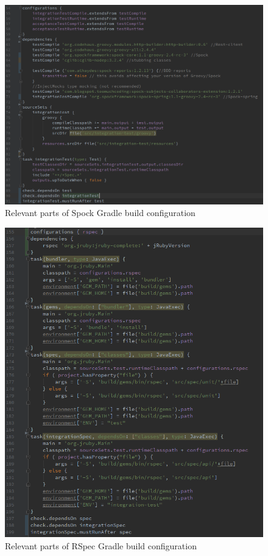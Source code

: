 \begin{figure}[ht]
  \begin{center}
    \includegraphics[width=13.7cm]{images/spock-gradle.png}
    \caption{Relevant parts of Spock Gradle build configuration}
    \label{fig:spock-build}
  \end{center}
\end{figure}

\begin{figure}[ht]
  \begin{center}
    \includegraphics[width=13.7cm]{images/rspec-build.png}
    \caption{Relevant parts of RSpec Gradle build configuration}
    \label{fig:rspec-build}
  \end{center}
\end{figure}


